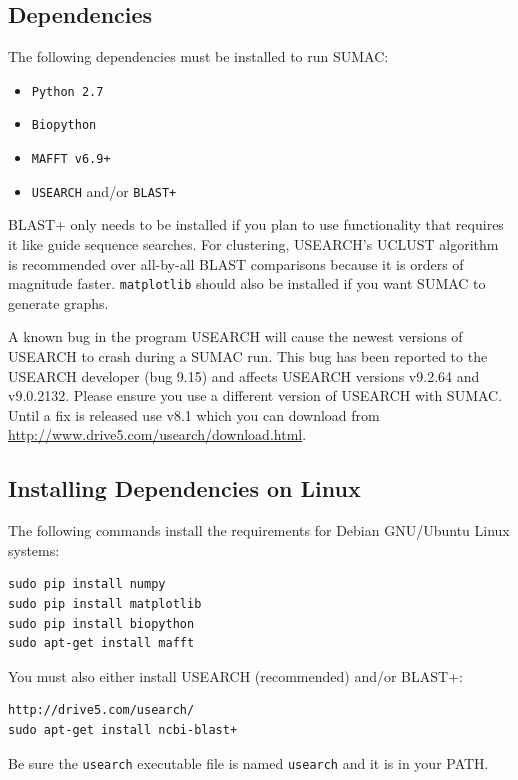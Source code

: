 \documentclass[10pt]{report}
\DeclareRobustCommand{\mybox}[2][gray!20]{
\begin{tcolorbox}[  
        breakable,
        left=0pt,
        right=0pt,
        top=0pt,
        bottom=0pt,
        colback=#1,
        colframe=#1,
        width=\dimexpr\textwidth\relax, 
        enlarge left by=0mm,
        boxsep=5pt,
        arc=0pt,outer arc=0pt,
        ]
        #2
\end{tcolorbox}
}
\begin{document}
\subsection{Dependencies}

The following dependencies must be installed to run SUMAC:

\begin{itemize}
\item \texttt{Python 2.7}
\item \texttt{Biopython}
\item \texttt{MAFFT v6.9+}
\item \texttt{USEARCH} and/or \texttt{BLAST+}
\end{itemize}

BLAST+ only needs to be installed if you plan to use functionality that requires it 
like guide sequence searches.
For clustering, USEARCH's UCLUST algorithm is recommended over all-by-all BLAST
comparisons because it is orders of magnitude faster.
\texttt{matplotlib} should also be installed if you want SUMAC to generate graphs.

\vspace{1cm}

\mybox[red!20!white]{
A known bug in the program USEARCH 
will cause the newest versions of USEARCH to crash during a SUMAC run. 
This bug has been reported to the USEARCH developer (bug 9.15) 
and affects USEARCH versions v9.2.64 and v9.0.2132. Please ensure you use a different version of USEARCH with SUMAC. 
Until a fix is released use v8.1 which you can download from \url{http://www.drive5.com/usearch/download.html}.
}


\subsection{Installing Dependencies on Linux}

The following commands install the requirements for Debian GNU/Ubuntu Linux systems:

\begin{verbatim}
sudo pip install numpy
sudo pip install matplotlib
sudo pip install biopython
sudo apt-get install mafft
\end{verbatim}
You must also either install USEARCH (recommended) and/or BLAST+:
\begin{verbatim}
http://drive5.com/usearch/
sudo apt-get install ncbi-blast+
\end{verbatim}
Be sure the \texttt{usearch} executable file is named
\texttt{usearch} and it is in your PATH.
\end{document}
